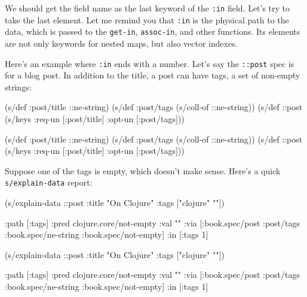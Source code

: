 We should get the field name as the last keyword of the \verb|:in| field. Let's try to take the last element. Let me remind you that \verb|:in| is the physical path to the data, which is passed to the \verb|get-in|, \verb|assoc-in|, and other functions. Its elements are not only keywords for nested maps, but also vector indexes.

Here's an example where \verb|:in| ends with a number. Let's say the \verb|::post| spec is for a blog post. In addition to the title, a post can have tags, a set of non-empty strings:

\ifx\DEVICETYPE\MOBILE

\begin{english}
  \begin{clojure}
(s/def :post/title ::ne-string)
(s/def :post/tags
  (s/coll-of ::ne-string))
(s/def ::post
  (s/keys :req-un [:post/title]
          :opt-un [:post/tags]))
  \end{clojure}
\end{english}

\else

\begin{english}
  \begin{clojure}
(s/def :post/title ::ne-string)
(s/def :post/tags (s/coll-of ::ne-string))
(s/def ::post (s/keys :req-un [:post/title]
                      :opt-un [:post/tags]))
  \end{clojure}
\end{english}

\fi

Suppose one of the tags is empty, which doesn't make sense. Here's a quick \verb|s/explain-data| report:

\ifx\DEVICETYPE\MOBILE

\begin{english}
  \begin{clojure}
(s/explain-data ::post
  {:title "On Clojure"
   :tags ["clojure" ""]})

{:path [:tags]
 :pred clojure.core/not-empty
 :val ""
 :via [:book.spec/post
       :post/tags
       :book.spec/ne-string
       :book.spec/not-empty]
 :in [:tags 1]}
  \end{clojure}
\end{english}

\else

\begin{english}
  \begin{clojure}
(s/explain-data ::post {:title "On Clojure"
                        :tags ["clojure" ""]})

{:path [:tags]
 :pred clojure.core/not-empty
 :val ""
 :via [:book.spec/post
       :post/tags
       :book.spec/ne-string
       :book.spec/not-empty]
 :in [:tags 1]}
  \end{clojure}
\end{english}

